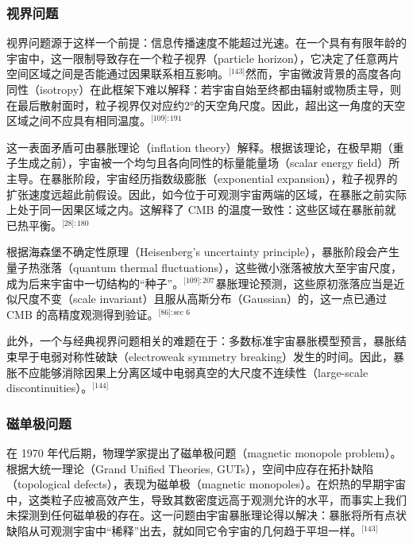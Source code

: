 \subsubsection{视界问题}
视界问题源于这样一个前提：信息传播速度不能超过光速。在一个具有有限年龄的宇宙中，这一限制导致存在一个粒子视界（particle horizon），它决定了任意两片空间区域之间是否能通过因果联系相互影响。\(^\text{[143]}\)然而，宇宙微波背景的高度各向同性（isotropy）在此框架下难以解释：若宇宙自始至终都由辐射或物质主导，则在最后散射面时，粒子视界仅对应约2°的天空角尺度。因此，超出这一角度的天空区域之间不应具有相同温度。\(^\text{[109]: 191 }\)

这一表面矛盾可由暴胀理论（inflation theory）解释。根据该理论，在极早期（重子生成之前），宇宙被一个均匀且各向同性的标量能量场（scalar energy field）所主导。在暴胀阶段，宇宙经历指数级膨胀（exponential expansion），粒子视界的扩张速度远超此前假设。因此，如今位于可观测宇宙两端的区域，在暴胀之前实际上处于同一因果区域之内。这解释了 CMB 的温度一致性：这些区域在暴胀前就已热平衡。\(^\text{[28]: 180 }\)

根据海森堡不确定性原理（Heisenberg's uncertainty principle），暴胀阶段会产生量子热涨落（quantum thermal fluctuations），这些微小涨落被放大至宇宙尺度，成为后来宇宙中一切结构的“种子”。\(^\text{[109]: 207 }\)暴胀理论预测，这些原初涨落应当是近似尺度不变（scale invariant）且服从高斯分布（Gaussian）的，这一点已通过 CMB 的高精度观测得到验证。\(^\text{[86]: sec 6 }\)

此外，一个与经典视界问题相关的难题在于：多数标准宇宙暴胀模型预言，暴胀结束早于电弱对称性破缺（electroweak symmetry breaking）发生的时间。因此，暴胀不应能够消除因果上分离区域中电弱真空的大尺度不连续性（large-scale discontinuities）。\(^\text{[144]}\)
\subsubsection{磁单极问题}
在 1970 年代后期，物理学家提出了磁单极问题（magnetic monopole problem）。根据大统一理论（Grand Unified Theories, GUTs），空间中应存在拓扑缺陷（topological defects），表现为磁单极（magnetic monopoles）。在炽热的早期宇宙中，这类粒子应被高效产生，导致其数密度远高于观测允许的水平，而事实上我们未探测到任何磁单极的存在。这一问题由宇宙暴胀理论得以解决：暴胀将所有点状缺陷从可观测宇宙中“稀释”出去，就如同它令宇宙的几何趋于平坦一样。\(^\text{[143]}\)
